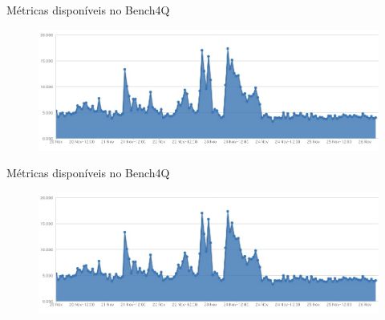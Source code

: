 \begin{frame}{Métricas disponíveis no Bench4Q}
	\begin{figure}[htb]
		\centering
		\includegraphics[scale=0.3]{../monograph/images/grafico-black-friday.jpg}	
	\end{figure}
\end{frame}

\begin{frame}{Métricas disponíveis no Bench4Q}
	\begin{figure}[htb]
		\centering
		\includegraphics[scale=0.3]{../monograph/images/grafico-black-friday.jpg}	
	\end{figure}
\end{frame}


